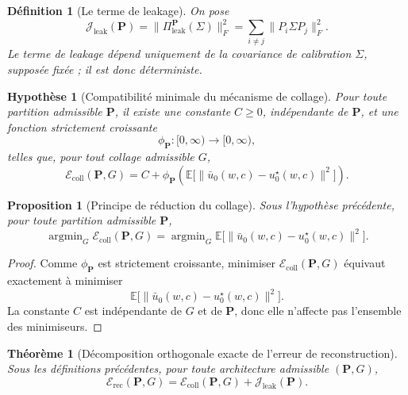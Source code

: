 \documentclass[11pt,a4paper]{article}
\newtheorem{definition}{Définition}[section]
\newtheorem{assumption}{Hypothèse}[section]
\newtheorem{proposition}{Proposition}[section]
\newtheorem{theorem}{Théorème}[section]
\DeclareMathOperator{\argmin}{argmin}
\newcommand{\1}{\mathbf 1}
\begin{document}
\begin{definition}[Le terme de leakage]
On pose
\[
\mathcal J_{\mathrm{leak}}(\mathbf P)
=
\bigl\|\Pi_{\mathrm{leak}}^{\mathbf P}(\Sigma)\bigr\|_F^2
=
\sum_{i\neq j}\|P_i\Sigma P_j\|_F^2.
\]
Le terme de leakage dépend uniquement de la covariance de calibration \(\Sigma\), supposée fixée ; il est donc déterministe.
\end{definition}

\begin{assumption}[Compatibilité minimale du mécanisme de collage]
Pour toute partition admissible \(\mathbf P\), il existe une constante \(C\ge 0\), indépendante de \(\mathbf P\), et une fonction strictement croissante
\[
\phi_{\mathbf P}:[0,\infty)\to[0,\infty),
\]
telles que, pour tout collage admissible \(G\),
\[
\mathcal E_{\mathrm{coll}}(\mathbf P,G)
=
C
+
\phi_{\mathbf P}\!\left(\mathbb E\bigl[\|\bar u_0(w,c)-u_0^\star(w,c)\|^2\bigr]\right).
\]
\end{assumption}

\begin{proposition}[Principe de réduction du collage]
Sous l'hypothèse précédente, pour toute partition admissible \(\mathbf P\),
\[
\argmin_G \mathcal E_{\mathrm{coll}}(\mathbf P,G)
=
\argmin_G \mathbb E\bigl[\|\bar u_0(w,c)-u_0^\star(w,c)\|^2\bigr].
\]
\end{proposition}

\begin{proof}
Comme \(\phi_{\mathbf P}\) est strictement croissante, minimiser \(\mathcal E_{\mathrm{coll}}(\mathbf P,G)\) équivaut exactement à minimiser
\[
\mathbb E\bigl[\|\bar u_0(w,c)-u_0^\star(w,c)\|^2\bigr].
\]
La constante \(C\) est indépendante de \(G\) et de \(\mathbf P\), donc elle n'affecte pas l'ensemble des minimiseurs.
\end{proof}

\begin{theorem}[Décomposition orthogonale exacte de l'erreur de reconstruction]
Sous les définitions précédentes, pour toute architecture admissible \((\mathbf P,G)\),
\[
\mathcal E_{\mathrm{rec}}(\mathbf P,G)
=
\mathcal E_{\mathrm{coll}}(\mathbf P,G)
+
\mathcal J_{\mathrm{leak}}(\mathbf P).
\]
\end{theorem}
\end{document}
